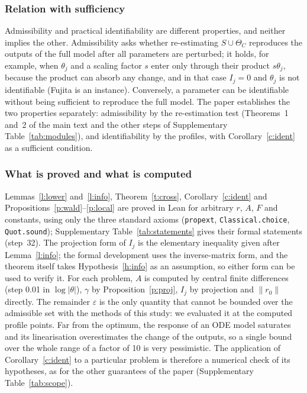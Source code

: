 \subsubsection*{Relation with sufficiency}
Admissibility and practical identifiability are different properties, and neither implies the other. Admissibility asks whether re-estimating $S\cup\Theta_C$ reproduces the outputs of the full model after all parameters are perturbed; it holds, for example, when $\theta_j$ and a scaling factor $s$ enter only through their product $s\theta_j$, because the product can absorb any change, and in that case $I_j=0$ and $\theta_j$ is not identifiable (Fujita is an instance). Conversely, a parameter can be identifiable without being sufficient to reproduce the full model. The paper establishes the two properties separately: admissibility by the re-estimation test (Theorems~1 and~2 of the main text and the other steps of Supplementary Table~\ref{tab:modules}), and identifiability by the profiles, with Corollary~\ref{c:ident} as a sufficient condition.

\subsubsection*{What is proved and what is computed}
Lemmas~\ref{l:lower} and~\ref{l:info}, Theorem~\ref{t:cross}, Corollary~\ref{c:ident} and Propositions~\ref{p:wald}--\ref{p:local} are proved in Lean for arbitrary $r$, $A$, $F$ and constants, using only the three standard axioms (\texttt{propext}, \texttt{Classical.choice}, \texttt{Quot.sound}); Supplementary Table~\ref{tab:statements} gives their formal statements (step~32). The projection form of $I_j$ is the elementary inequality given after Lemma~\ref{l:info}; the formal development uses the inverse-matrix form, and the theorem itself takes Hypothesis~\ref{h:info} as an assumption, so either form can be used to verify it. For each problem, $A$ is computed by central finite differences (step 0.01 in $\log|\theta|$), $\gamma$ by Proposition~\ref{p:proj}, $I_j$ by projection and $\|r_0\|$ directly. The remainder $\varepsilon$ is the only quantity that cannot be bounded over the admissible set with the methods of this study: we evaluated it at the computed profile points. Far from the optimum, the response of an ODE model saturates and its linearisation overestimates the change of the outputs, so a single bound over the whole range of a factor of 10 is very pessimistic. The application of Corollary~\ref{c:ident} to a particular problem is therefore a numerical check of its hypotheses, as for the other guarantees of the paper (Supplementary Table~\ref{tab:scope}).
